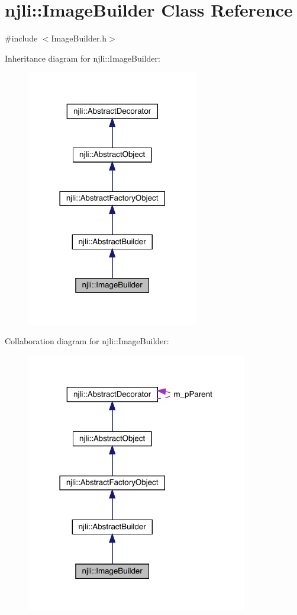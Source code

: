\hypertarget{classnjli_1_1_image_builder}{}\section{njli\+:\+:Image\+Builder Class Reference}
\label{classnjli_1_1_image_builder}


{\ttfamily \#include $<$Image\+Builder.\+h$>$}



Inheritance diagram for njli\+:\+:Image\+Builder\+:\nopagebreak
\begin{figure}[H]
\begin{center}
\leavevmode
\includegraphics[width=213pt]{classnjli_1_1_image_builder__inherit__graph}
\end{center}
\end{figure}


Collaboration diagram for njli\+:\+:Image\+Builder\+:\nopagebreak
\begin{figure}[H]
\begin{center}
\leavevmode
\includegraphics[width=273pt]{classnjli_1_1_image_builder__coll__graph}
\end{center}
\end{figure}
